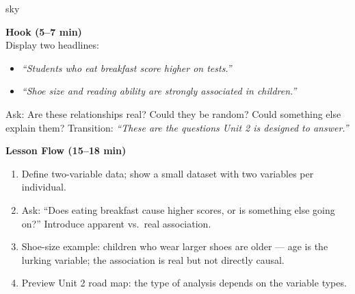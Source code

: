 \documentclass[10pt]{article}
\begin{document}
\begin{skillbox}{sky}
\begin{minipage}[t]{0.48\linewidth}
    \textbf{Hook (5--7 min)}\\
    Display two headlines:
    \begin{itemize}
        \item \textit{``Students who eat breakfast score higher on tests.''}
        \item \textit{``Shoe size and reading ability are strongly associated in children.''}
    \end{itemize}
    Ask: Are these relationships real? Could they be random? Could something else explain them?
    Transition: \textit{``These are the questions Unit 2 is designed to answer.''}
\end{minipage}
\hfill
\begin{minipage}[t]{0.48\linewidth}
    \textbf{Lesson Flow (15--18 min)}
    \begin{enumerate}
        \item Define two-variable data; show a small dataset with two variables per individual.
        \item Ask: ``Does eating breakfast cause higher scores, or is something else going on?'' Introduce apparent vs.\ real association.
        \item Shoe-size example: children who wear larger shoes are older --- age is the lurking variable; the association is real but not directly causal.
        \item Preview Unit 2 road map: the type of analysis depends on the variable types.
    \end{enumerate}
\end{minipage}
\end{skillbox}
\end{document}
